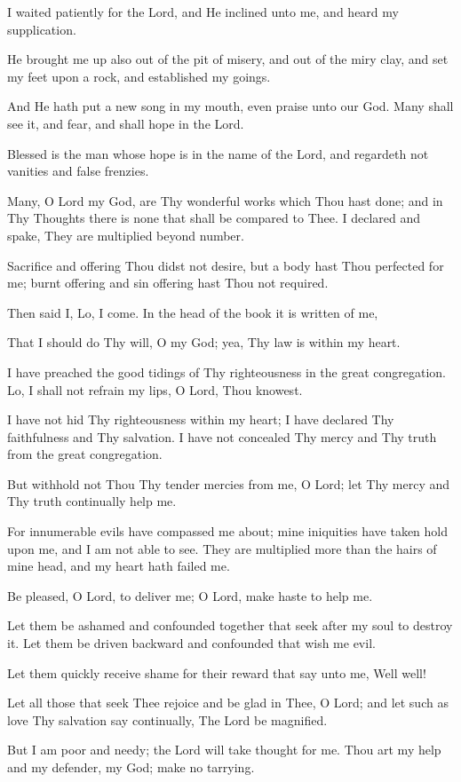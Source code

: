 I waited patiently for the Lord, and He inclined unto me, and heard my supplication.

He brought me up also out of the pit of misery, and out of the miry clay, and set my feet upon a rock, and established my goings.

And He hath put a new song in my mouth, even praise unto our God. Many shall see it, and fear, and shall hope in the Lord.

Blessed is the man whose hope is in the name of the Lord, and regardeth not vanities and false frenzies.

Many, O Lord my God, are Thy wonderful works which Thou hast done; and in Thy Thoughts there is none that shall be compared to Thee. I declared and spake, They are multiplied beyond number.

Sacrifice and offering Thou didst not desire, but a body hast Thou perfected for me; burnt offering and sin offering hast Thou not required.

Then said I, Lo, I come. In the head of the book it is written of me,

That I should do Thy will, O my God; yea, Thy law is within my heart.

I have preached the good tidings of Thy righteousness in the great congregation. Lo, I shall not refrain my lips, O Lord, Thou knowest.

I have not hid Thy righteousness within my heart; I have declared Thy faithfulness and Thy salvation. I have not concealed Thy mercy and Thy truth from the great congregation.

But withhold not Thou Thy tender mercies from me, O Lord; let Thy mercy and Thy truth continually help me.

For innumerable evils have compassed me about; mine iniquities have taken hold upon me, and I am not able to see. They are multiplied more than the hairs of mine head, and my heart hath failed me.

Be pleased, O Lord, to deliver me; O Lord, make haste to help me.

Let them be ashamed and confounded together that seek after my soul to destroy it. Let them be driven backward and confounded that wish me evil.

Let them quickly receive shame for their reward that say unto me, Well well!

Let all those that seek Thee rejoice and be glad in Thee, O Lord; and let such as love Thy salvation say continually, The Lord be magnified.

But I am poor and needy; the Lord will take thought for me. Thou art my help and my defender, my God; make no tarrying.
